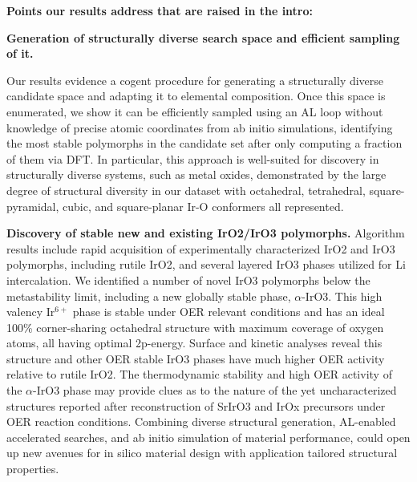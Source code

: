 


%

\textbf{Points our results address that are raised in the intro:}

\textbf{Generation of structurally diverse search space and efficient sampling of it.}

Our results evidence a cogent procedure for generating a structurally diverse candidate space and adapting it to elemental composition.  Once this space is enumerated, we show it can be efficiently sampled using an AL loop without knowledge of precise atomic coordinates from ab initio simulations, identifying the most stable polymorphs in the candidate set after only computing a fraction of them via DFT.  In particular, this approach is well-suited for discovery in structurally diverse systems, such as metal oxides, demonstrated by the large degree of structural diversity in our dataset with octahedral, tetrahedral,  square-pyramidal,  cubic,  and  square-planar Ir-O conformers all represented.

\textbf{Discovery of stable new and existing IrO2/IrO3 polymorphs.}
Algorithm results include rapid acquisition of experimentally characterized IrO2 and IrO3 polymorphs, including rutile IrO2, and several layered IrO3 phases utilized for Li intercalation. We identified a number of novel IrO3 polymorphs below the metastability limit, including a new globally stable phase, $\alpha$-IrO3.   This high valency Ir$^{6+}$ phase is stable under OER relevant conditions and has an ideal 100\% corner-sharing octahedral structure with maximum coverage of oxygen atoms, all having optimal 2p-energy.  Surface and kinetic analyses reveal this structure and other OER stable IrO3 phases have much higher OER activity relative to rutile IrO2.  The thermodynamic stability and high OER activity of the $\alpha$-IrO3 phase may provide clues as to the nature of the yet uncharacterized structures reported after reconstruction of SrIrO3 and IrOx precursors under OER reaction conditions.  Combining diverse structural generation, AL-enabled accelerated searches, and ab initio simulation of material performance, could open up new avenues for in silico material design with application tailored structural properties.

